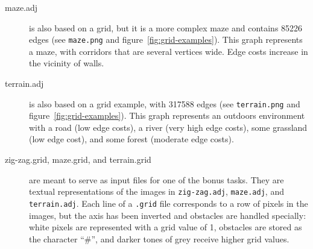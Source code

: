 \documentclass[a4paper,10pt]{article}
\begin{document}
\begin{description}
\item[maze.adj]
  is also based on a grid, but it is a more complex maze and contains 85226 edges (see \texttt{maze.png} and figure~\ref{fig:grid-examples}).
  This graph represents a maze, with corridors that are several vertices wide.
  Edge costs increase in the vicinity of walls.

\item[terrain.adj]
  is also based on a grid example, with 317588 edges (see \texttt{terrain.png} and figure~\ref{fig:grid-examples}).
  This graph represents an outdoors environment with a road (low edge costs), a river (very high edge costs), some grassland (low edge cost), and some forest (moderate edge costs).
  
\item[zig-zag.grid, maze.grid, and terrain.grid]
  are meant to serve as input files for one of the bonus tasks.
  They are textual representations of the images in \texttt{zig-zag.adj}, \texttt{maze.adj}, and \texttt{terrain.adj}.
  Each line of a \texttt{.grid} file corresponds to a row of pixels in the images, but the axis has been inverted and obstacles are handled specially:
  white pixels are represented with a grid value of 1, obstacles are stored as the character ``\#'', and darker tones of grey receive higher grid values.
  
\end{description}
\end{document}
